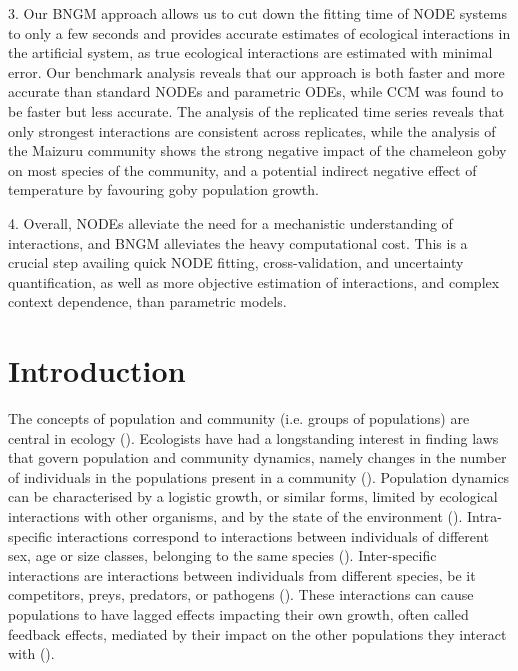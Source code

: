 \documentclass[11pt, oneside]{article}
\begin{document}
3. Our BNGM approach allows us to cut down the fitting time of NODE systems to only a few seconds and provides accurate estimates of ecological interactions in the artificial system, as true ecological interactions are estimated with minimal error.
Our benchmark analysis reveals that our approach is both faster and more accurate than standard NODEs and parametric ODEs, while CCM was found to be faster but less accurate. 
The analysis of the replicated time series reveals that only strongest interactions are consistent across replicates, while the analysis of the Maizuru community shows the strong negative impact of the chameleon goby on most species of the community, and a potential indirect negative effect of temperature by favouring goby population growth.

4. Overall, NODEs alleviate the need for a mechanistic understanding of interactions, and BNGM alleviates the heavy computational cost. 
This is a crucial step availing quick NODE fitting, cross-validation, and uncertainty quantification, as well as more objective estimation of interactions, and complex context dependence, than parametric models. 

\newpage
{}
\setcounter{page}{1}
\linenumbers
{}

\section{Introduction}

The concepts of population and community (i.e. groups of populations) are central in ecology (\cite{Berryman2002}).
Ecologists have had a longstanding interest in finding laws that govern population and community dynamics, namely changes in the number of individuals in the populations present in a community (\cite{Lawton1999,Turchin1999a}).
Population dynamics can be characterised by a logistic growth, or similar forms, limited by ecological interactions with other organisms, and by the state of the environment (\cite{Turchin2001c,Berryman2003}).
Intra-specific interactions correspond to interactions between individuals of different sex, age or size classes, belonging to the same species (\cite{Turchin2001c}).
Inter-specific interactions are interactions between individuals from different species, be it competitors, preys, predators, or pathogens (\cite{Turchin2001c,Berryman2003}).
These interactions can cause populations to have lagged effects impacting their own growth, often called feedback effects, mediated by their impact on the other populations they interact with (\cite{Berryman1997}).
\end{document}
